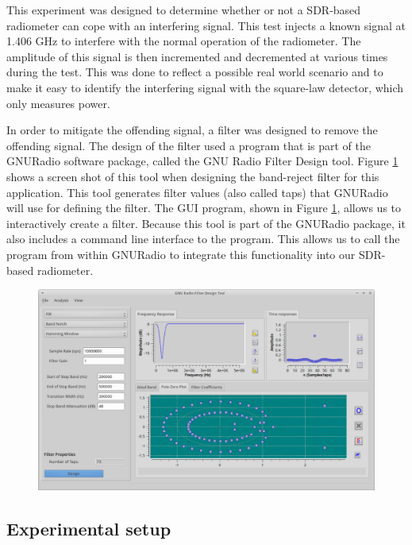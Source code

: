 This experiment was designed to determine whether or not a SDR-based radiometer can cope with an interfering signal.  This test injects a known signal at 1.406 GHz to interfere with the normal operation of the radiometer.  The amplitude of this signal is then incremented and decremented at various times during the test.  This was done to reflect a possible real world scenario and to make it easy to identify the interfering signal with the square-law detector, which only measures power.  

In order to mitigate the offending signal, a filter was designed to remove the offending signal.  The design of the filter used a program that is part of the GNURadio software package, called the GNU Radio Filter Design tool.  Figure \ref{GRC_Filter_DSN} shows a screen shot of this tool when designing the band-reject filter for this application.  This tool generates filter values (also called taps) that GNURadio will use for defining the filter.  The GUI program, shown in Figure \ref{GRC_Filter_DSN}, allows us to interactively create a filter.  Because this tool is part of the GNURadio package, it also includes a command line interface to the program.  This allows us to call the program from within GNURadio to integrate this functionality into our SDR-based radiometer.  

\begin{figure}[h!tb] \centering
\includegraphics[width=\textwidth]{Images/GNURadio_Filter_dsn.png}
\label{GRC_Filter_DSN}
\end{figure}  

\subsection{Experimental setup} \label{exp3_setup}

